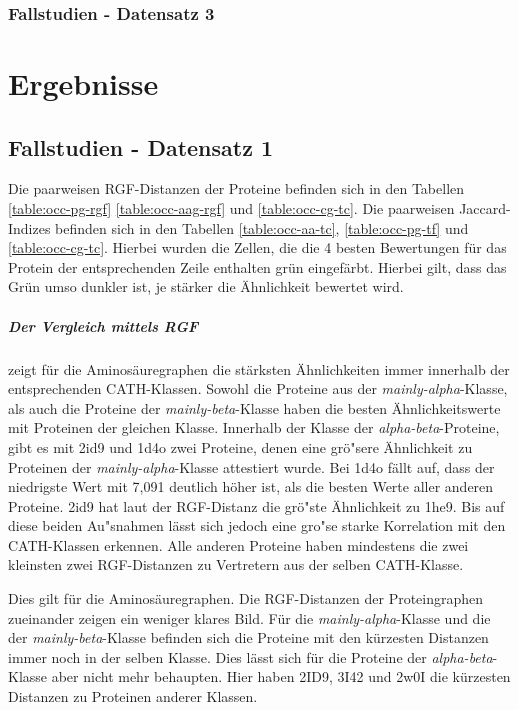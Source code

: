 \documentclass{report}
\begin{document}
\subsection{Fallstudien - Datensatz 3}



\chapter{Ergebnisse}

\section{Fallstudien - Datensatz 1}

Die paarweisen RGF-Distanzen der Proteine befinden sich in den Tabellen \ref{table:occ-pg-rgf} \ref{table:occ-aag-rgf} und \ref{table:occ-cg-tc}. Die paarweisen Jaccard-Indizes befinden sich in den Tabellen \ref{table:occ-aa-tc}, \ref{table:occ-pg-tf} und \ref{table:occ-cg-tc}.
Hierbei wurden die Zellen, die die 4 besten Bewertungen f\"ur das Protein der entsprechenden Zeile enthalten gr\"un eingef\"arbt. Hierbei gilt, dass das Gr\"un umso dunkler ist, je st\"arker die \"Ahnlichkeit bewertet wird.

\paragraph{Der Vergleich mittels RGF}
zeigt f\"ur die Aminos\"auregraphen die st\"arksten \"Ahnlichkeiten immer innerhalb der entsprechenden CATH-Klassen. Sowohl die Proteine aus der \textit{mainly-alpha}-Klasse, als auch die Proteine der \textit{mainly-beta}-Klasse haben die besten \"Ahnlichkeitswerte mit Proteinen der gleichen Klasse.
Innerhalb der Klasse der \textit{alpha-beta}-Proteine, gibt es mit 2id9 und 1d4o zwei Proteine, denen eine gr\"o"sere \"Ahnlichkeit zu Proteinen der \textit{mainly-alpha}-Klasse attestiert wurde.
Bei 1d4o f\"allt auf, dass der niedrigste Wert mit 7,091 deutlich h\"oher ist, als die besten Werte aller anderen Proteine.
2id9 hat laut der RGF-Distanz die gr\"o"ste \"Ahnlichkeit zu 1he9.
Bis auf diese beiden Au"snahmen l\"asst sich jedoch eine gro"se starke Korrelation mit den CATH-Klassen erkennen.
Alle anderen Proteine haben mindestens die zwei kleinsten zwei RGF-Distanzen zu Vertretern aus der selben CATH-Klasse.

Dies gilt f\"ur die Aminos\"auregraphen. Die RGF-Distanzen der Proteingraphen zueinander zeigen ein weniger klares Bild.
F\"ur die \textit{mainly-alpha}-Klasse und die der \textit{mainly-beta}-Klasse befinden sich die Proteine mit den k\"urzesten Distanzen immer noch in der selben Klasse. Dies l\"asst sich f\"ur die Proteine der \textit{alpha-beta}-Klasse aber nicht mehr behaupten. Hier haben 2ID9, 3I42 und 2w0I die k\"urzesten Distanzen zu Proteinen anderer Klassen.
\end{document}

